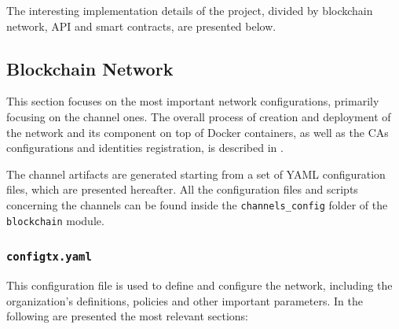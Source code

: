 \documentclass{scrartcl}
\begin{document}
\iffalse

The interesting implementation details of the project, divided by blockchain network, API and smart contracts, are presented below.

\subsection{Blockchain Network}
\label{sec:blockchain-network-impl}

This section focuses on the most important network configurations, primarily focusing on the channel ones.
%
The overall process of creation and deployment of the network and its component on top of Docker containers, as well as the CAs configurations and identities registration, is described in .

The channel artifacts are generated starting from a set of YAML configuration files, which are presented hereafter.
%
All the configuration files and scripts concerning the channels can be found inside the \texttt{channels\_config} folder of the \texttt{blockchain} module.

\subsubsection*{\texttt{configtx.yaml}}

This configuration file is used to define and configure the network, including the organization's definitions, policies and other important parameters.
%
In the following are presented the most relevant sections:
\end{document}
